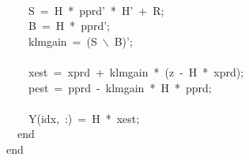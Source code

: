 \documentclass{article}\usepackage[]{graphicx}\usepackage[]{color}
\makeatletter
\newcommand{\hlstr}[1]{\textcolor[rgb]{0.863,0.196,0.184}{#1}}%
\newcommand{\hlopt}[1]{\textcolor[rgb]{0.576,0.631,0.631}{#1}}%
\newcommand{\hlstd}[1]{\textcolor[rgb]{0.514,0.58,0.588}{#1}}%
\newcommand{\hlkwa}[1]{\textcolor[rgb]{0.796,0.294,0.086}{#1}}%
\newenvironment{kframe}{%
 \def\at@end@of@kframe{}%
 \ifinner\ifhmode%
  \def\at@end@of@kframe{\end{minipage}}%
  \begin{minipage}{\columnwidth}%
 \fi\fi%
 \def\FrameCommand##1{\hskip\@totalleftmargin \hskip-\fboxsep
 \colorbox{shadecolor}{##1}\hskip-\fboxsep
     \hskip-\linewidth \hskip-\@totalleftmargin \hskip\columnwidth}%
 \MakeFramed {\advance\hsize-\width
   \@totalleftmargin\z@ \linewidth\hsize
   \@setminipage}}%
 {\par\unskip\endMakeFramed%
 \at@end@of@kframe}
\newenvironment{knitrout}{}{} %
\makeatother
\begin{document}
\begin{knitrout}
\begin{kframe}
\hlstd{}\hlstd{\ \ \ \ }\hlstd{}\hspace*{\fill}\\
\hlstd{}\hlstd{\ \ \ \ }\hlstd{S\ }\hlopt{=\ }\hlstd{H\ }\hlopt{{*}\ }\hlstd{p\textunderscore prd}\hlstr{'\ {*}\ H'}\hlstd{\ }\hlopt{+\ }\hlstd{R}\hlopt{;}\hspace*{\fill}\\
\hlstd{}\hlstd{\ \ \ \ }\hlstd{B\ }\hlopt{=\ }\hlstd{H\ }\hlopt{{*}\ }\hlstd{p\textunderscore prd}\hlstr{';}\hspace*{\fill}\\
\hlstr{}\hlstd{\ \ \ \ }\hlstr{klm\textunderscore gain\ =\ (S\ $\backslash$\ B)'}\hlstd{}\hlopt{;}\hspace*{\fill}\\
\hlstd{}\hlstd{\ \ \ \ }\hlstd{}\hspace*{\fill}\\
\hlstd{}\hlstd{\ \ \ \ }\hlstd{x\textunderscore est\ }\hlopt{=\ }\hlstd{x\textunderscore prd\ }\hlopt{+\ }\hlstd{klm\textunderscore gain\ }\hlopt{{*}\ (}\hlstd{z\ }\hlopt{{-}\ }\hlstd{H\ }\hlopt{{*}\ }\hlstd{x\textunderscore prd}\hlopt{);}\hspace*{\fill}\\
\hlstd{}\hlstd{\ \ \ \ }\hlstd{p\textunderscore est\ }\hlopt{=\ }\hlstd{p\textunderscore prd\ }\hlopt{{-}\ }\hlstd{klm\textunderscore gain\ }\hlopt{{*}\ }\hlstd{H\ }\hlopt{{*}\ }\hlstd{p\textunderscore prd}\hlopt{;}\hspace*{\fill}\\
\hlstd{}\hlstd{\ \ \ \ }\hlstd{}\hspace*{\fill}\\
\hlstd{}\hlstd{\ \ \ \ }\hlstd{Y}\hlopt{(}\hlstd{idx}\hlopt{,\ :)\ =\ }\hlstd{H\ }\hlopt{{*}\ }\hlstd{x\textunderscore est}\hlopt{;}\hspace*{\fill}\\
\hlstd{}\hlstd{\ \ }\hlstd{}\hlkwa{end}\hlstd{\ \ \ \ \ \ \ \ \ \ \ \ \ \ \ \ }\hlkwa{}\hlstd{}\hspace*{\fill}\\
\hlstd{}\hlkwa{end}\hlstd{\ \ \ }\hlkwa{}\hlstd{}\hlstd{}\hspace*{\fill}
\mbox{}
\normalfont
\normalsize
\end{kframe}
\end{knitrout}
\end{document}
